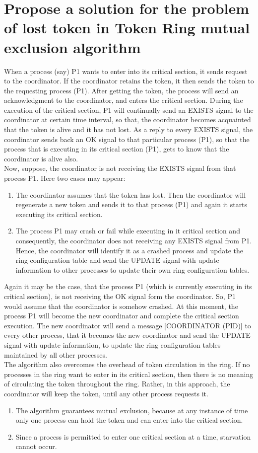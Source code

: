 \documentclass[11pt,a4paper]{article}
\begin{document}
\section{Propose a solution for the problem of lost token in Token Ring mutual exclusion algorithm}
When a process (say) P1 wants to enter into its critical
section, it sends request to the coordinator. If the
coordinator retains the token, it then sends the token to the
requesting process (P1). After getting the token, the
process will send an acknowledgment to the coordinator,
and enters the critical section. During the execution of the
critical section, P1 will continually send an EXISTS signal
to the coordinator at certain time interval, so that, the
coordinator becomes acquainted that the token is alive and
it has not lost. As a reply to every EXISTS signal, the
coordinator sends back an OK signal to that particular
process (P1), so that the process that is executing in its
critical section (P1), gets to know that the coordinator is
alive also.\\
Now, suppose, the coordinator is not receiving the
EXISTS signal from that process P1. Here two cases may
appear:
\begin{enumerate}
	\item The coordinator assumes that the token has lost. Then the coordinator will regenerate a new token and sends it to that
process (P1) and again it starts executing its critical
section.
	\item The process P1 may crash or fail while executing in it
critical section and consequently, the coordinator does not
receiving any EXISTS signal from P1. Hence, the coordinator will identify it as a crashed process and update the ring configuration table and send the UPDATE signal with update information to other processes to update their own ring configuration tables.
\end{enumerate}
Again it may be the case, that the process P1 (which is currently executing in its critical section), is not receiving the OK signal form the coordinator. So, P1 would assume that the coordinator is somehow crashed. At this moment, the process P1 will become the new coordinator and complete the critical section execution. The new coordinator will send a message [COORDINATOR (PID)] to every other process, that it becomes the new coordinator and send the UPDATE signal with update information, to update the ring configuration tables maintained by all other
processes.\\
The algorithm also overcomes the overhead of token
circulation in the ring. If no processes in the ring want to
enter in its critical section, then there is no meaning of
circulating the token throughout the ring. Rather, in this
approach, the coordinator will keep the token, until any
other process requests it.
\begin{enumerate}
	\item The algorithm guarantees mutual exclusion, because at
any instance of time only one process can hold the token and can enter into the critical section.
	\item Since a process is permitted to enter one critical
section at a time, starvation cannot occur. 
\end{enumerate}
\end{document}
